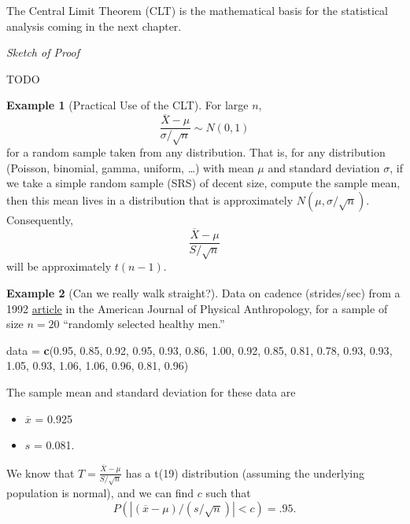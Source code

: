 \documentclass[
]{book}
\newenvironment{Shaded}{\begin{snugshade}}{\end{snugshade}}
\newcommand{\FloatTok}[1]{\textcolor[rgb]{0.00,0.00,0.81}{#1}}
\newcommand{\FunctionTok}[1]{\textcolor[rgb]{0.13,0.29,0.53}{\textbf{#1}}}
\newcommand{\NormalTok}[1]{#1}
\newcommand{\OtherTok}[1]{\textcolor[rgb]{0.56,0.35,0.01}{#1}}
\providecommand{\tightlist}{%
  \setlength{\itemsep}{0pt}\setlength{\parskip}{0pt}}
\theoremstyle{definition}
\theoremstyle{definition}
\newtheorem{example}{Example}[chapter]
\theoremstyle{definition}
\theoremstyle{definition}
\theoremstyle{remark}
\begin{document}
The Central Limit Theorem (CLT) is the mathematical basis for the statistical analysis coming in the next chapter.

\emph{Sketch of Proof}

TODO

\begin{example}[Practical Use of the CLT]
\protect\hypertarget{exm:clt-use}{}\label{exm:clt-use}For large \(n\), \[\frac{\overline{X}-\mu}{\sigma/\sqrt{n}} \sim N(0,1)\] for a random sample taken from any distribution.
That is, for any distribution (Poisson, binomial, gamma, uniform, \ldots) with mean \(\mu\) and standard deviation \(\sigma\), if we take a simple random sample (SRS) of decent size, compute the sample mean, then this mean lives in a distribution that is approximately \(N(\mu,\sigma/\sqrt{n})\). Consequently, \[\frac{\overline{X}-\mu}{S/\sqrt{n}}\] will be approximately \(t(n-1)\).
\end{example}

\begin{example}[Can we really walk straight?]
\protect\hypertarget{exm:walk-straight}{}\label{exm:walk-straight}Data on cadence (strides/sec) from a 1992 \href{https://onlinelibrary.wiley.com/doi/10.1002/ajpa.1330890104}{article} in the American Journal of Physical Anthropology, for a sample of size \(n = 20\) ``randomly selected healthy men.''

\begin{Shaded}
\begin{Highlighting}[]
\NormalTok{data }\OtherTok{=} \FunctionTok{c}\NormalTok{(}\FloatTok{0.95}\NormalTok{, }\FloatTok{0.85}\NormalTok{, }\FloatTok{0.92}\NormalTok{, }\FloatTok{0.95}\NormalTok{, }\FloatTok{0.93}\NormalTok{, }\FloatTok{0.86}\NormalTok{, }\FloatTok{1.00}\NormalTok{, }\FloatTok{0.92}\NormalTok{, }\FloatTok{0.85}\NormalTok{, }\FloatTok{0.81}\NormalTok{,}
\FloatTok{0.78}\NormalTok{, }\FloatTok{0.93}\NormalTok{, }\FloatTok{0.93}\NormalTok{, }\FloatTok{1.05}\NormalTok{, }\FloatTok{0.93}\NormalTok{, }\FloatTok{1.06}\NormalTok{, }\FloatTok{1.06}\NormalTok{, }\FloatTok{0.96}\NormalTok{, }\FloatTok{0.81}\NormalTok{, }\FloatTok{0.96}\NormalTok{)}
\end{Highlighting}
\end{Shaded}

The sample mean and standard deviation for these data are

\begin{itemize}
\tightlist
\item
  \(\overline{x}\) = 0.925
\item
  \(s\) = 0.081.
\end{itemize}

We know that \(T = \frac{\overline{X}-\mu}{S/\sqrt{n}}\) has a t(19) distribution (assuming the underlying population is normal), and we can find \(c\) such that \[P(|(\overline{x}-\mu)/(s/\sqrt{n})| < c) = .95.\]
\end{example}
\end{document}
